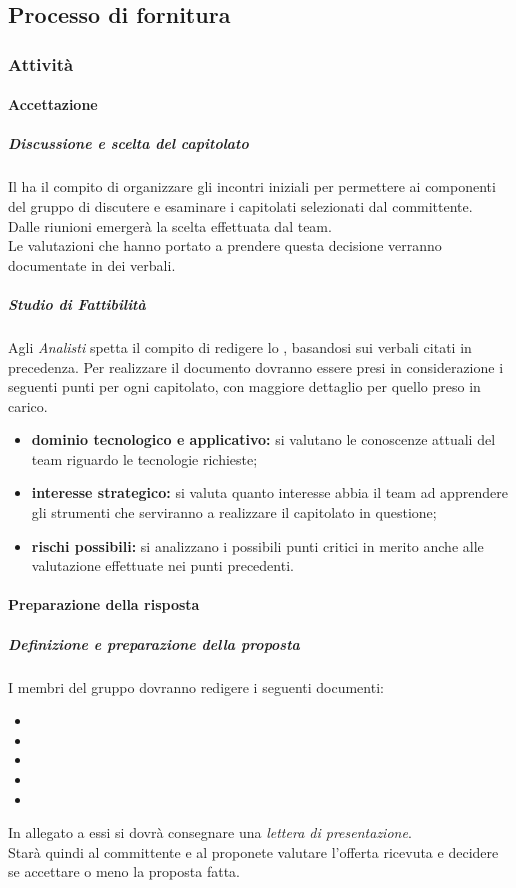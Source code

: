 	\subsection{Processo di fornitura}
		\subsubsection{Attività}

			\paragraph{Accettazione}
				\subparagraph{Discussione e scelta del capitolato}
				Il \roleProjectManager{} ha il compito di organizzare	gli incontri iniziali per permettere ai componenti del gruppo di discutere e esaminare i capitolati selezionati dal committente. \\
				Dalle riunioni emergerà la scelta effettuata dal team. \\
				Le valutazioni che hanno portato a prendere questa decisione verranno documentate in dei verbali.

				\subparagraph{Studio di Fattibilità}
				Agli \emph{Analisti} spetta il compito di redigere lo \docNameVersionSdF{}, basandosi sui verbali citati in precedenza.
Per realizzare il documento dovranno essere presi in considerazione i seguenti punti per ogni capitolato, con maggiore dettaglio per quello preso in carico.
					\begin{itemize}
						\item \textbf{dominio tecnologico e applicativo:} si valutano le conoscenze attuali del team riguardo le tecnologie richieste;
						\item \textbf{interesse strategico:} si valuta quanto interesse abbia il team ad apprendere gli strumenti che serviranno a realizzare il capitolato in questione;
						\item \textbf{rischi possibili:} si analizzano i possibili punti critici in merito anche alle valutazione effettuate nei punti precedenti.
					\end{itemize}
			\paragraph{Preparazione della risposta}
				\subparagraph{Definizione e preparazione della proposta}
				I membri del gruppo \groupName{} dovranno redigere i seguenti documenti: \\
					\begin{itemize}
						\item \docNameVersionSdF
						\item \docNameVersionAdR
						\item \docNameVersionPdP
						\item \docNameVersionPdQ
						\item \docNameVersionNdP
					\end{itemize}
				In allegato a essi si dovrà consegnare una \emph{lettera di presentazione}. \\
				Starà quindi al committente e al proponete valutare l'offerta ricevuta e decidere se accettare o meno la proposta fatta.

